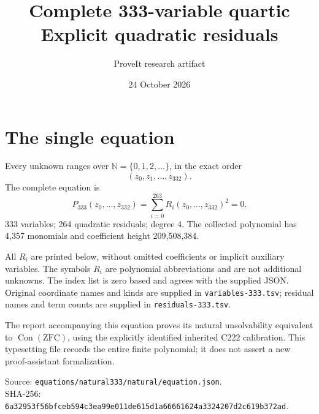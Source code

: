 \documentclass[10pt]{article}
\begin{document}
\title{Complete 333-variable quartic\\Explicit quadratic residuals}
\author{ProveIt research artifact}
\date{24 October 2026}
\maketitle
\section*{The single equation}
Every unknown ranges over $\mathbb N=\{0,1,2,\ldots\}$, in the exact order
\[
(z_0,z_1,\ldots,z_{332}).
\]
The complete equation is
\[
\boxed{P_{333}(z_0,\ldots,z_{332})=\sum_{i=0}^{263} R_i(z_0,\ldots,z_{332})^2=0.}
\]
333 variables; 264 quadratic residuals; degree 4. The collected polynomial has 4,357 monomials and coefficient height 209,508,384.

All $R_i$ are printed below, without omitted coefficients or implicit auxiliary variables. The symbols $R_i$ are polynomial abbreviations and are not additional unknowns. The index list is zero based and agrees with the supplied JSON. Original coordinate names and kinds are supplied in \texttt{variables-333.tsv}; residual names and term counts are supplied in \texttt{residuals-333.tsv}.

The report accompanying this equation proves its natural unsolvability equivalent to $\operatorname{Con}(\mathrm{ZFC})$, using the explicitly identified inherited C222 calibration. This typesetting file records the entire finite polynomial; it does not assert a new proof-assistant formalization.

Source: \texttt{equations/natural333/natural/equation.json}.\\
SHA-256: \texttt{\small 6a32953f56bfceb594c3ea99e011de615d1a66661624a3324207d2c619b372ad}.
\end{document}

